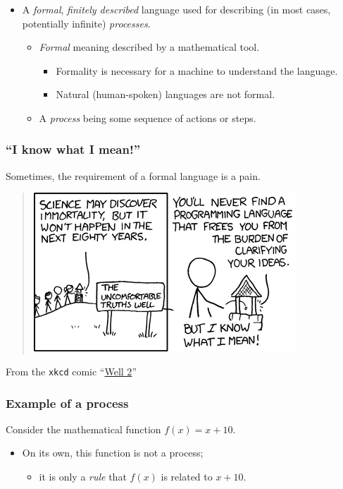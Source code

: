 \documentclass[11pt]{article}
\theoremstyle{definition}
\begin{document}
\begin{itemize}
\item A \emph{formal}, \emph{finitely described} language used for
describing (in most cases, potentially infinite) \emph{processes}.
\begin{itemize}
\item \emph{Formal} meaning described by a mathematical tool.
\begin{itemize}
\item Formality is necessary for a machine to understand the language.
\item Natural (human-spoken) languages are not formal.
\end{itemize}
\item A \emph{process} being some sequence of actions or steps.
\end{itemize}
\end{itemize}

\subsubsection{“I know what I mean!”}
\label{sec:org197c2c3}

Sometimes, the requirement of a formal language is a pain.

\begin{quote}
\includegraphics{./media/comics/well_2.png}
\end{quote}
From the \texttt{xkcd} comic “\href{https://xkcd.com/568/}{Well 2}” 

\subsubsection{Example of a process}
\label{sec:orgcaf9edf}

Consider the mathematical function \(f(x) = x + 10\).
\begin{itemize}
\item On its own, this function is not a process;
\begin{itemize}
\item it is only a \emph{rule} that \(f(x)\) is related to \(x + 10\).
\end{itemize}
\end{itemize}
\end{document}
